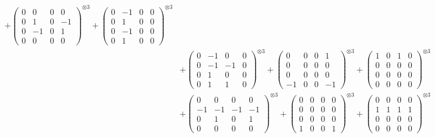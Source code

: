 \documentclass{article}
\begin{document}
{\begin{align}
            + \begin{pmatrix} 0 & 0 & 0 & 0 \\ 0 & 1 & 0 & -1 \\ 0 & -1 & 0 & 1 \\ 0 & 0 & 0 & 0 \end{pmatrix}^{\otimes 3} 
            + \begin{pmatrix} 0 & -1 & 0 & 0 \\ 0 & 1 & 0 & 0 \\ 0 & -1 & 0 & 0 \\ 0 & 1 & 0 & 0 \end{pmatrix}^{\otimes 3} \\
        &+ \label{Rs16-Rc11-Solution-7-c10} \begin{pmatrix} 0 & -1 & 0 & 0 \\ 0 & -1 & -1 & 0 \\ 0 & 1 & 0 & 0 \\ 0 & 1 & 1 & 0 \end{pmatrix}^{\otimes 3} 
            + \begin{pmatrix} 0 & 0 & 0 & 1 \\ 0 & 0 & 0 & 0 \\ 0 & 0 & 0 & 0 \\ -1 & 0 & 0 & -1 \end{pmatrix}^{\otimes 3} 
            + \begin{pmatrix} 1 & 0 & 1 & 0 \\ 0 & 0 & 0 & 0 \\ 0 & 0 & 0 & 0 \\ 0 & 0 & 0 & 0 \end{pmatrix}^{\otimes 3} \\
        &+ \label{Rs16-Rc11-Solution-7-c13} \begin{pmatrix} 0 & 0 & 0 & 0 \\ -1 & -1 & -1 & -1 \\ 0 & 1 & 0 & 1 \\ 0 & 0 & 0 & 0 \end{pmatrix}^{\otimes 3} 
            + \begin{pmatrix} 0 & 0 & 0 & 0 \\ 0 & 0 & 0 & 0 \\ 0 & 0 & 0 & 0 \\ 1 & 0 & 0 & 1 \end{pmatrix}^{\otimes 3} 
            + \begin{pmatrix} 0 & 0 & 0 & 0 \\ 1 & 1 & 1 & 1 \\ 0 & 0 & 0 & 0 \\ 0 & 0 & 0 & 0 \end{pmatrix}^{\otimes 3} \\

\end{align}}
\end{document}
